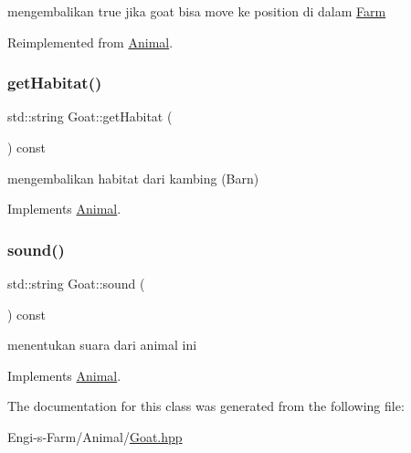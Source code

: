 mengembalikan true jika goat bisa move ke position di dalam \mbox{\hyperlink{class_farm}{Farm}} 

Reimplemented from \mbox{\hyperlink{class_animal_a0529aaf00a6368ea123110683cc4e2f2}{Animal}}.

\mbox{\label{class_goat_a10f7555af9962fa54783f288cbf47d95}} 
\subsubsection{\texorpdfstring{getHabitat()}{getHabitat()}}
{\footnotesize\ttfamily std\+::string Goat\+::get\+Habitat (\begin{DoxyParamCaption}{ }\end{DoxyParamCaption}) const\hspace{0.3cm}{\ttfamily [virtual]}}

mengembalikan habitat dari kambing (Barn) 

Implements \mbox{\hyperlink{class_animal_a3de687fb42b792132a09176c4a0e2125}{Animal}}.

\mbox{\label{class_goat_adfb044fddaba239be655d3f5fa9feb5e}} 
\subsubsection{\texorpdfstring{sound()}{sound()}}
{\footnotesize\ttfamily std\+::string Goat\+::sound (\begin{DoxyParamCaption}{ }\end{DoxyParamCaption}) const\hspace{0.3cm}{\ttfamily [virtual]}}

menentukan suara dari animal ini 

Implements \mbox{\hyperlink{class_animal_aca8216576b21b87f761a34686a4968a8}{Animal}}.



The documentation for this class was generated from the following file\+:\begin{DoxyCompactItemize}
\item 
Engi-\/s-\/\+Farm/\+Animal/\mbox{\hyperlink{_goat_8hpp}{Goat.\+hpp}}\end{DoxyCompactItemize}
